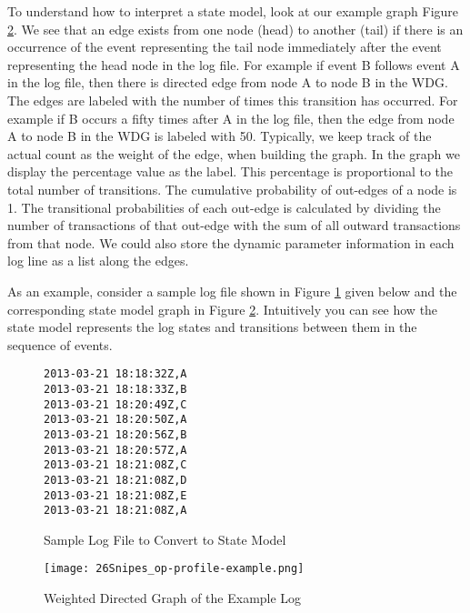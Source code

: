 To understand how to interpret a state model, look at our example graph Figure \ref{op-profile-example}.  We see that an edge exists from one node (head) to another (tail) if there is an occurrence of the event representing the tail node immediately after the event representing the head node in the  log file. For example if event B follows event A in the log file, then there is directed edge from node A to node B in the WDG. The edges are labeled with the number of times this transition has occurred.  For example if B occurs a fifty times after A in the log file, then the edge from node A to node B in the WDG is labeled with 50. Typically, we keep track of the actual count as the weight of the edge, when building the graph. In the graph we display the percentage value as the label. This percentage is proportional to the total number of transitions.  The cumulative probability of out-edges of a node is 1. The transitional probabilities of each out-edge is calculated by dividing the number of transactions of that out-edge with the sum of all outward transactions from that node. We could also store the dynamic parameter information in each log line as a list along the edges. 

As an example, consider a sample log file shown in Figure \ref{samplelogfile} given below and the corresponding state model graph in Figure \ref{op-profile-example}. Intuitively you can see how the state model represents the log states and transitions between them in the sequence of events.  

\begin{figure}
\hrulefill
\begin{verbatim}
2013-03-21 18:18:32Z,A
2013-03-21 18:18:33Z,B
2013-03-21 18:20:49Z,C
2013-03-21 18:20:50Z,A
2013-03-21 18:20:56Z,B
2013-03-21 18:20:57Z,A
2013-03-21 18:21:08Z,C
2013-03-21 18:21:08Z,D
2013-03-21 18:21:08Z,E
2013-03-21 18:21:08Z,A
\end{verbatim}
\hrulefill
\caption{Sample Log File to Convert to State Model}\label{samplelogfile}
\end{figure}

\begin{figure}[h]
  \centering
  \texttt{[image: 26Snipes\_op-profile-example.png]}
  \caption{Weighted Directed Graph of the Example Log}\label{op-profile-example}
\end{figure}






 
